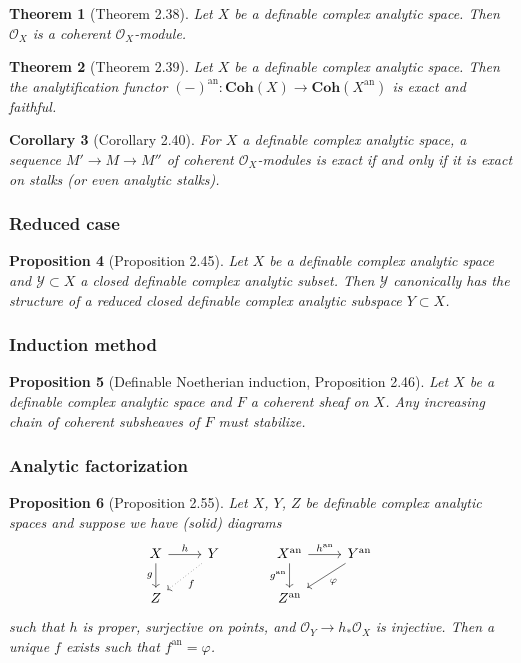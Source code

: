 \documentclass{amsart}
\newtheorem{theorem}{Theorem}[subsection]
\newtheorem{proposition}[theorem]{Proposition}
\newtheorem{corollary}[theorem]{Corollary}
\theoremstyle{definition}
\numberwithin{equation}{section}
\newcommand{\analytic}{\mathrm{an}}
\begin{document}
\begin{theorem}[Theorem 2.38]
  Let $X$ be a definable complex analytic space.
  Then $\mathcal{O}_X$ is a coherent $\mathcal{O}_X$-module.
\end{theorem}

\begin{theorem}[Theorem 2.39]
  Let $X$ be a definable complex analytic space.
  Then the analytification functor
  $(-)^{\analytic}: \mathbf{Coh}(X) \to \mathbf{Coh}(X^{\analytic})$ is exact and faithful.
\end{theorem}

\begin{corollary}[Corollary 2.40]
  For $X$ a definable complex analytic space,
  a sequence $M' \to M \to M''$ of coherent $\mathcal{O}_X$-modules
  is exact if and only if it is exact on stalks (or even analytic stalks).
\end{corollary}

\subsubsection{Reduced case}
\begin{proposition}[Proposition 2.45]
  Let $X$ be a definable complex analytic space and
  $\mathcal{Y} \subset X$ a closed definable complex analytic subset.
  Then $\mathcal{Y}$ canonically has the structure of a reduced closed definable complex analytic subspace $Y \subset X$.
\end{proposition}

\subsubsection{Induction method}
\begin{proposition}[Definable Noetherian induction, Proposition 2.46]
  Let $X$ be a definable complex analytic space and $F$ a coherent sheaf on $X$.
  Any increasing chain of coherent subsheaves of $F$ must stabilize.
\end{proposition}

\subsubsection{Analytic factorization}
\begin{proposition}[Proposition 2.55]
  Let $X$, $Y$, $Z$ be definable complex analytic spaces and
  suppose we have (solid) diagrams
  \[
    \begin{tikzcd}
      X \ar[r,"h"] \ar[d,"g"'] & Y\ar[dl,"f",dotted] \\ Z
    \end{tikzcd}
    \hspace*{30pt}
    \begin{tikzcd}
      X^{\analytic} \ar[r,"h^{\analytic}"] \ar[d,"g^{\analytic}"'] & Y^{\analytic}\ar[dl,"\varphi"] \\ Z^{\analytic}
    \end{tikzcd}
  \]
  such that $h$ is proper, surjective on points,
  and $\mathcal{O}_Y \to h_*\mathcal{O}_X$ is injective.
  Then a unique $f$ exists such that $f^{\analytic} = \varphi$.
\end{proposition}
\end{document}
